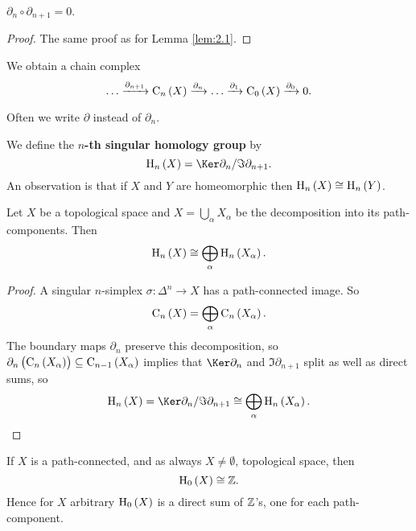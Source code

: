 \begin{lemma}
$ \partial_n \circ \partial_{n + 1} = 0 $.
\end{lemma}

\begin{proof}
The same proof as for Lemma \ref{lem:2.1}.
\end{proof}

We obtain a chain complex
$$ \dots \xrightarrow{\partial_{n + 1}} \C_n\br{X} \xrightarrow{\partial_n} \dots \xrightarrow{\partial_1} \C_0\br{X} \xrightarrow{\partial_0} 0. $$

\begin{remark*}
Often we write $ \partial $ instead of $ \partial_n $.
\end{remark*}

We define the \textbf{$ n $-th singular homology group} by
$$ \H_n\br{X} = \Ker \partial_n / \Im \partial_{n + 1}. $$
An observation is that if $ X $ and $ Y $ are homeomorphic then $ \H_n\br{X} \cong \H_n\br{Y} $.

\begin{proposition}
\label{prop:2.6}
Let $ X $ be a topological space and $ X = \bigcup_\alpha X_\alpha $ be the decomposition into its path-components. Then
$$ \H_n\br{X} \cong \bigoplus_\alpha \H_n\br{X_\alpha}. $$
\end{proposition}

\begin{proof}
A singular $ n $-simplex $ \sigma : \Delta^n \to X $ has a path-connected image. So
$$ \C_n\br{X} = \bigoplus_\alpha \C_n\br{X_\alpha}. $$
The boundary maps $ \partial_n $ preserve this decomposition, so $ \partial_n\br{\C_n\br{X_\alpha}} \subseteq \C_{n - 1}\br{X_\alpha} $ implies that $ \Ker \partial_n $ and $ \Im \partial_{n + 1} $ split as well as direct sums, so
$$ \H_n\br{X} = \Ker \partial_n / \Im \partial_{n + 1} \cong \bigoplus_\alpha \H_n\br{X_\alpha}. $$
\end{proof}

\begin{proposition}
\label{prop:2.7}
If $ X $ is a path-connected, and as always $ X \ne \emptyset $, topological space, then
$$ \H_0\br{X} \cong \ZZ. $$
Hence for $ X $ arbitrary $ \H_0\br{X} $ is a direct sum of $ \mathbb{Z} $'s, one for each path-component.
\end{proposition}

